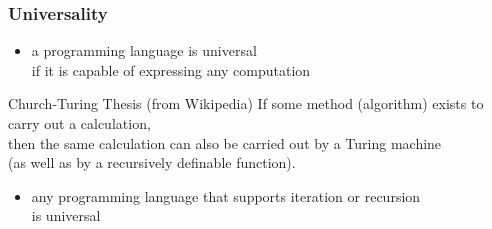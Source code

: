 \documentclass[dvipsnames]{beamer}
\theoremstyle{plain}
\begin{document}
\begin{frame}
  \frametitle{Universality}

  \begin{itemize}
    \item a programming language is \alert{universal}\\
      if it is capable of expressing any computation
  \end{itemize}

  \begin{block}{Church-Turing Thesis (from Wikipedia)}
    If some method (algorithm) exists to carry out a calculation,\\
    then the same calculation can also be carried out by a Turing machine\\
    (as well as by a recursively definable function).
  \end{block}
  
  \begin{itemize}
    \item any programming language that supports iteration or recursion\\
      is universal
  \end{itemize}
\end{frame}
\end{document}
